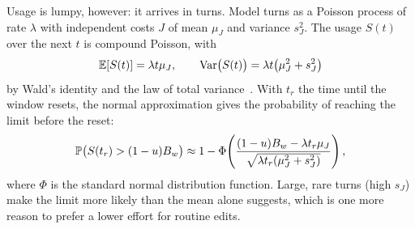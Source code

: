 Usage is lumpy, however: it arrives in turns. Model turns as a Poisson process
of rate $\lambda$ with independent costs $J$ of mean $\mu_J$ and variance
$s_J^2$. The usage $S(t)$ over the next $t$ is compound Poisson, with
\begin{equation}
  \mathbb{E}[S(t)] = \lambda t \mu_J, \qquad
  \operatorname{Var}\bigl(S(t)\bigr) = \lambda t \bigl(\mu_J^2 + s_J^2\bigr)
  \label{eq:compound}
\end{equation}
by Wald's identity and the law of total variance~\cite{feller1968}. With $t_r$ the time until the window
resets, the normal approximation gives the probability of reaching the limit
before the reset:
\begin{equation}
  \mathbb{P}\bigl(S(t_r) > (1 - u) B_w\bigr) \approx
  1 - \Phi\!\left(
    \frac{(1 - u) B_w - \lambda t_r \mu_J}
         {\sqrt{\lambda t_r (\mu_J^2 + s_J^2)}}
  \right),
  \label{eq:limit-probability}
\end{equation}
where $\Phi$ is the standard normal distribution function. Large, rare turns
(high $s_J$) make the limit more likely than the mean alone suggests, which is
one more reason to prefer a lower effort for routine edits.
